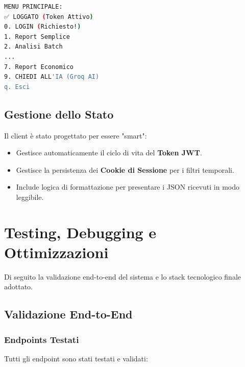 \documentclass[a4paper,12pt]{report}
\begin{document}
\begin{lstlisting}[language=bash, caption=Esempio di Menu CLI]
MENU PRINCIPALE:
✅ LOGGATO (Token Attivo)
0. LOGIN (Richiesto!)
1. Report Semplice
2. Analisi Batch
...
7. Report Economico
9. CHIEDI ALL'IA (Groq AI)
q. Esci
\end{lstlisting}

\section{Gestione dello Stato}
Il client è stato progettato per essere "smart":
\begin{itemize}
    \item Gestisce automaticamente il ciclo di vita del \textbf{Token JWT}.
    \item Gestisce la persistenza dei \textbf{Cookie di Sessione} per i filtri temporali.
    \item Include logica di formattazione per presentare i JSON ricevuti in modo leggibile.
\end{itemize}

\chapter{Testing, Debugging e Ottimizzazioni}

Di seguito la validazione end-to-end del sistema e lo stack tecnologico finale adottato.

\section{Validazione End-to-End}

\subsection{Endpoints Testati}
Tutti gli endpoint sono stati testati e validati:
\end{document}
